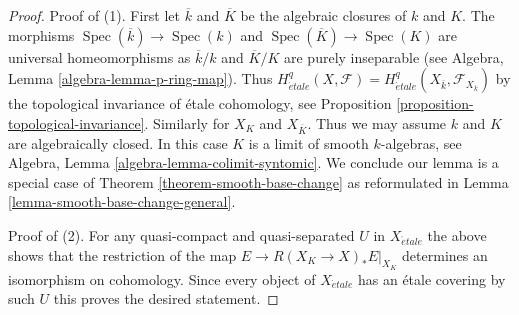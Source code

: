 \documentclass[10pt,a4paper]{amsart}
\theoremstyle{plain}
\theoremstyle{definition}
\theoremstyle{remark}
\numberwithin{equation}{subsection}
\def\Spec{\mathop{\mathrm{Spec}}}
\def\etale{{\acute{e}tale}}
\begin{document}
\begin{proof}
Proof of (1). First let $\overline{k}$ and $\overline{K}$
be the algebraic closures
of $k$ and $K$. The morphisms $\Spec(\overline{k}) \to \Spec(k)$ and
$\Spec(\overline{K}) \to \Spec(K)$ are universal homeomorphisms
as $\overline{k}/k$ and $\overline{K}/K$ are purely inseparable
(see Algebra, Lemma \ref{algebra-lemma-p-ring-map}).
Thus $H^q_\etale(X, \mathcal{F}) =
H^q_\etale(X_{\overline{k}}, \mathcal{F}_{X_{\overline{k}}})$ by
the topological invariance of \'etale cohomology, see
Proposition \ref{proposition-topological-invariance}.
Similarly for $X_K$ and $X_{\overline{K}}$.
Thus we may assume $k$ and $K$ are algebraically closed.
In this case $K$ is a limit of smooth $k$-algebras, see
Algebra, Lemma \ref{algebra-lemma-colimit-syntomic}.
We conclude our lemma is a special case of
Theorem \ref{theorem-smooth-base-change} as reformulated in
Lemma \ref{lemma-smooth-base-change-general}.

\medskip\noindent
Proof of (2). For any quasi-compact and quasi-separated $U$ in $X_\etale$
the above shows that the restriction of the map
$E \to R(X_K \to X)_*E|_{X_K}$ determines an isomorphism on cohomology.
Since every object of $X_\etale$ has an \'etale covering by such $U$
this proves the desired statement.
\end{proof}
\end{document}
